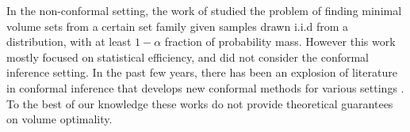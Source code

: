 In the non-conformal setting, the work of \citep{scott2006learning} studied the problem of finding minimal volume sets from a certain set family given samples drawn i.i.d from a distribution, with at least $1-\alpha$ fraction of probability mass. However this work mostly focused on statistical efficiency, and did not consider the conformal inference setting. 
In the past few years, there has been an explosion of literature in conformal inference that develops new conformal methods for various settings \citep[see e.g., ][and references therein]{barber2021predictive, stutz2022learning,Kumar2023ConformalPW, barber2023beyond, xie2024boosted}. To the best of our knowledge these works do not provide theoretical guarantees on volume optimality. 